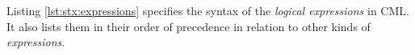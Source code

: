 Listing \ref{lst:stx:expressions} specifies the syntax of
the \emph{logical expressions} in CML.
It also lists them in their order of precedence
in relation to other kinds of \emph{expressions}.
